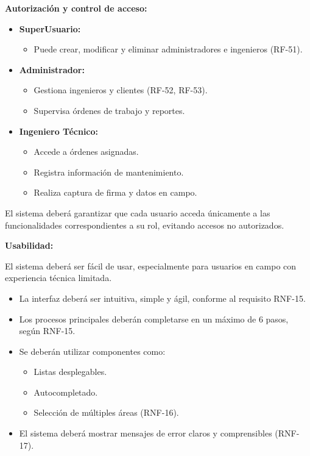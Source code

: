 \documentclass[12pt,a4paper]{article}
\begin{document}
\textbf{Autorización y control de acceso:}

\begin{itemize}
  \item \textbf{SuperUsuario:}
  \begin{itemize}
    \item Puede crear, modificar y eliminar administradores e ingenieros (RF-51).
  \end{itemize}

  \item \textbf{Administrador:}
  \begin{itemize}
    \item Gestiona ingenieros y clientes (RF-52, RF-53).
    \item Supervisa órdenes de trabajo y reportes.
  \end{itemize}

  \item \textbf{Ingeniero Técnico:}
  \begin{itemize}
    \item Accede a órdenes asignadas.
    \item Registra información de mantenimiento.
    \item Realiza captura de firma y datos en campo.
  \end{itemize}
\end{itemize}

El sistema deberá garantizar que cada usuario acceda únicamente a las funcionalidades correspondientes a su rol, evitando accesos no autorizados.

\textbf{Usabilidad:}

El sistema deberá ser fácil de usar, especialmente para usuarios en campo con experiencia técnica limitada.

\begin{itemize}
  \item La interfaz deberá ser intuitiva, simple y ágil, conforme al requisito RNF-15.

  \item Los procesos principales deberán completarse en un máximo de 6 pasos, según RNF-15.

  \item Se deberán utilizar componentes como:
  \begin{itemize}
    \item Listas desplegables.
    \item Autocompletado.
    \item Selección de múltiples áreas (RNF-16).
  \end{itemize}

  \item El sistema deberá mostrar mensajes de error claros y comprensibles (RNF-17).
\end{itemize}
\end{document}
